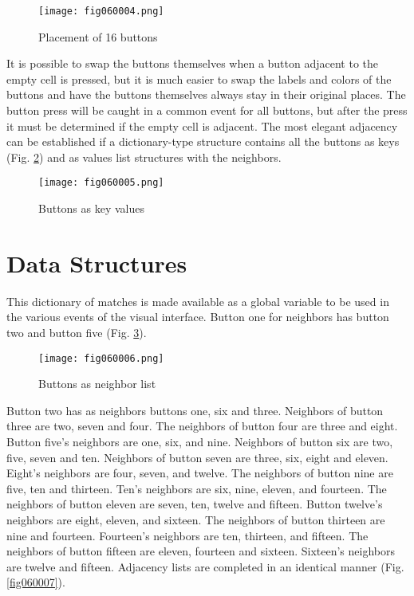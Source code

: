 \begin{figure}[H]
   \centering
   \texttt{[image: fig060004.png]}
   \caption{Placement of 16 buttons}
\label{fig060004}
\end{figure}

It is possible to swap the buttons themselves when a button adjacent to the empty cell is pressed, but it is much easier to swap the labels and colors of the buttons and have the buttons themselves always stay in their original places. The button press will be caught in a common event for all buttons, but after the press it must be determined if the empty cell is adjacent. The most elegant adjacency can be established if a dictionary-type structure contains all the buttons as keys (Fig. \ref{fig060005}) and as values list structures with the neighbors.

\begin{figure}[H]
   \centering
   \texttt{[image: fig060005.png]}
   \caption{Buttons as key values}
\label{fig060005}
\end{figure}

\section{Data Structures}

This dictionary of matches is made available as a global variable to be used in the various events of the visual interface. Button one for neighbors has button two and button five (Fig. \ref{fig060006}).

\begin{figure}[H]
   \centering
   \texttt{[image: fig060006.png]}
   \caption{Buttons as neighbor list}
\label{fig060006}
\end{figure}

Button two has as neighbors buttons one, six and three. Neighbors of button three are two, seven and four. The neighbors of button four are three and eight. Button five's neighbors are one, six, and nine. Neighbors of button six are two, five, seven and ten. Neighbors of button seven are three, six, eight and eleven. Eight's neighbors are four, seven, and twelve. The neighbors of button nine are five, ten and thirteen. Ten's neighbors are six, nine, eleven, and fourteen. The neighbors of button eleven are seven, ten, twelve and fifteen. Button twelve's neighbors are eight, eleven, and sixteen. The neighbors of button thirteen are nine and fourteen. Fourteen's neighbors are ten, thirteen, and fifteen. The neighbors of button fifteen are eleven, fourteen and sixteen. Sixteen's neighbors are twelve and fifteen. Adjacency lists are completed in an identical manner (Fig. \ref{fig060007}).

